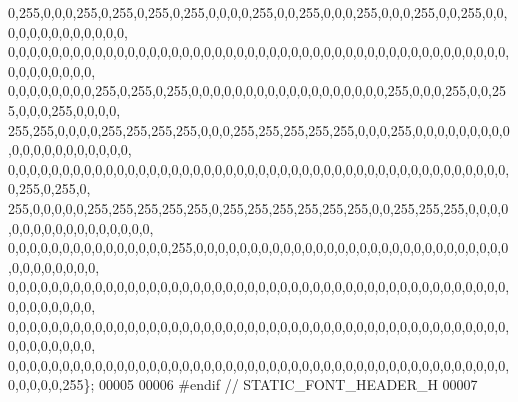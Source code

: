\begin{DoxyCode}
      0,255,0,0,0,255,0,255,0,255,0,255,0,0,0,0,255,0,0,255,0,0,0,255,0,0,0,255,0,0,255,0,0,0,0,0,0,0,0,0,0,0,0,0,
      0,0,0,0,0,0,0,0,0,0,0,0,0,0,0,0,0,0,0,0,0,0,0,0,0,0,0,0,0,0,0,0,0,0,0,0,0,0,0,0,0,0,0,0,0,0,0,0,0,0,0,0,0,0,
      0,0,0,0,0,0,0,0,255,0,255,0,255,0,0,0,0,0,0,0,0,0,0,0,0,0,0,0,0,0,0,255,0,0,0,255,0,0,255,0,0,0,255,0,0,0,0,
      255,255,0,0,0,0,255,255,255,255,0,0,0,255,255,255,255,255,0,0,0,255,0,0,0,0,0,0,0,0,0,0,0,0,0,0,0,0,0,0,0,0,
      0,0,0,0,0,0,0,0,0,0,0,0,0,0,0,0,0,0,0,0,0,0,0,0,0,0,0,0,0,0,0,0,0,0,0,0,0,0,0,0,0,0,0,0,0,0,0,255,0,255,0,
      255,0,0,0,0,0,255,255,255,255,255,0,255,255,255,255,255,255,0,0,255,255,255,0,0,0,0,0,0,0,0,0,0,0,0,0,0,0,0,0,
      0,0,0,0,0,0,0,0,0,0,0,0,0,0,0,255,0,0,0,0,0,0,0,0,0,0,0,0,0,0,0,0,0,0,0,0,0,0,0,0,0,0,0,0,0,0,0,0,0,0,0,0,0,
      0,0,0,0,0,0,0,0,0,0,0,0,0,0,0,0,0,0,0,0,0,0,0,0,0,0,0,0,0,0,0,0,0,0,0,0,0,0,0,0,0,0,0,0,0,0,0,0,0,0,0,0,0,0,
      0,0,0,0,0,0,0,0,0,0,0,0,0,0,0,0,0,0,0,0,0,0,0,0,0,0,0,0,0,0,0,0,0,0,0,0,0,0,0,0,0,0,0,0,0,0,0,0,0,0,0,0,0,0,
      0,0,0,0,0,0,0,0,0,0,0,0,0,0,0,0,0,0,0,0,0,0,0,0,0,0,0,0,0,0,0,0,0,0,0,0,0,0,0,0,0,0,0,0,0,0,0,0,0,0,0,255\};
00005 
00006 \textcolor{preprocessor}{#endif // STATIC\_FONT\_HEADER\_H}
00007 
\end{DoxyCode}
